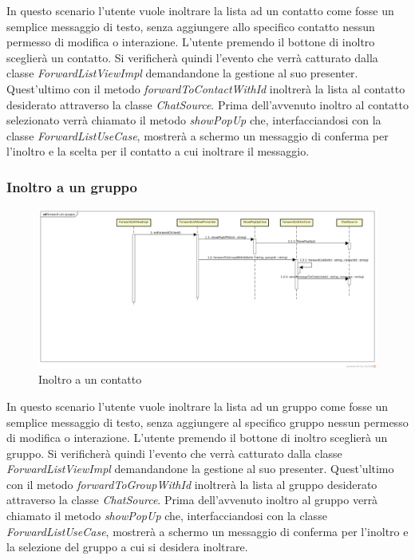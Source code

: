 In questo scenario l'utente vuole inoltrare la lista ad un contatto come fosse un semplice messaggio di testo, senza aggiungere allo specifico contatto nessun permesso di modifica o interazione. L'utente premendo il bottone di inoltro sceglierà un contatto. Si verificherà quindi l'evento che verrà catturato dalla classe \textit{ForwardListViewImpl} demandandone la gestione al suo presenter.
Quest'ultimo con il metodo \textit{forwardToContactWithId} inoltrerà la lista al contatto desiderato attraverso la classe \textit{ChatSource}. Prima dell'avvenuto inoltro al contatto selezionato verrà chiamato il metodo \textit{showPopUp} che, interfacciandosi con la classe \textit{ForwardListUseCase}, mostrerà a schermo un messaggio di conferma per l'inoltro e la scelta per il contatto a cui inoltrare il messaggio.



\subsubsection{Inoltro a un gruppo}

\label{Inoltro a un contatto}
\begin{figure}[H]
	\centering
	\includegraphics[width=\textwidth]{Sezioni/Diagrammi/img_app/forward_con_gruppo.jpg}
	\caption{Inoltro a un contatto}
	
\end{figure}

In questo scenario l'utente vuole inoltrare la lista ad un gruppo come fosse un semplice messaggio di testo, senza aggiungere al specifico gruppo nessun permesso di modifica o interazione. L'utente premendo il bottone di inoltro sceglierà un gruppo. Si verificherà quindi l'evento che verrà catturato dalla classe \textit{ForwardListViewImpl} demandandone la gestione al suo presenter.
Quest'ultimo con il metodo \textit{forwardToGroupWithId} inoltrerà la lista al gruppo desiderato attraverso la classe \textit{ChatSource}. Prima dell'avvenuto inoltro al gruppo verrà chiamato il metodo \textit{showPopUp} che, interfacciandosi con la classe \textit{ForwardListUseCase}, mostrerà a schermo un messaggio di conferma per l'inoltro e la selezione del gruppo a cui si desidera inoltrare.


